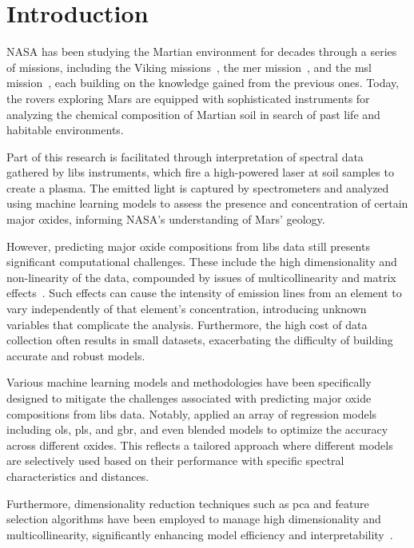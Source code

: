 \section{Introduction}\label{sec:introduction}
NASA has been studying the Martian environment for decades through a series of missions, including the Viking missions~\cite{marsnasagov_vikings}, the \gls{mer} mission~\cite{marsnasagov_observer, marsnasagov_spirit_opportunity}, and the \gls{msl} mission~\cite{marsnasagov_msl}, each building on the knowledge gained from the previous ones.
Today, the rovers exploring Mars are equipped with sophisticated instruments for analyzing the chemical composition of Martian soil in search of past life and habitable environments.

Part of this research is facilitated through interpretation of spectral data gathered by \gls{libs} instruments, which fire a high-powered laser at soil samples to create a plasma.
The emitted light is captured by spectrometers and analyzed using machine learning models to assess the presence and concentration of certain major oxides, informing NASA's understanding of Mars' geology.

However, predicting major oxide compositions from \gls{libs} data still presents significant computational challenges. 
These include the high dimensionality and non-linearity of the data, compounded by issues of multicollinearity and matrix effects~\cite{andersonImprovedAccuracyQuantitative2017}. 
Such effects can cause the intensity of emission lines from an element to vary independently of that element's concentration, introducing unknown variables that complicate the analysis. 
Furthermore, the high cost of data collection often results in small datasets, exacerbating the difficulty of building accurate and robust models.

Various machine learning models and methodologies have been specifically designed to mitigate the challenges associated with predicting major oxide compositions from \gls{libs} data. 
Notably, \citet{andersonPostlandingMajorElement2022} applied an array of regression models including \gls{ols}, \gls{pls}, and \gls{gbr}, and even blended models to optimize the accuracy across different oxides. 
This reflects a tailored approach where different models are selectively used based on their performance with specific spectral characteristics and distances.

Furthermore, dimensionality reduction techniques such as \gls{pca} and feature selection algorithms have been employed to manage high dimensionality and multicollinearity, significantly enhancing model efficiency and interpretability~\cite{rezaei_dimensionality_reduction}.

